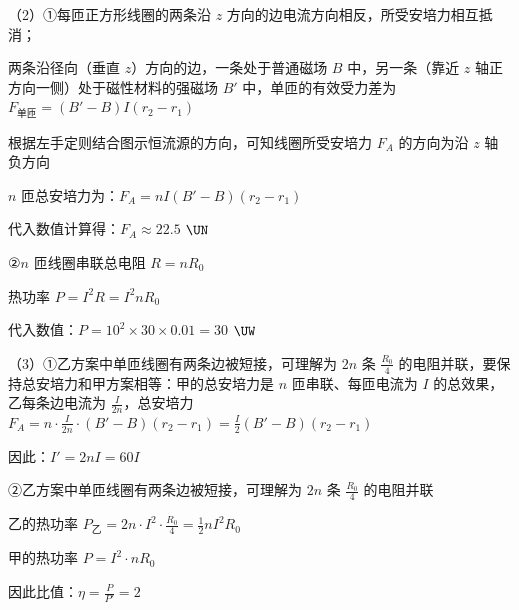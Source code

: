 \documentclass[\gkver]{gaokaozhenti}
\begin{document}
\begin{enumerate}
{（2）①每匝正方形线圈的两条沿 $z$ 方向的边电流方向相反，所受安培力相互抵消；

两条沿径向（垂直 $z$）方向的边，一条处于普通磁场 $B$ 中，另一条（靠近 $z$ 轴正方向一侧）处于磁性材料的强磁场 $B'$ 中，单匝的有效受力差为 $F_{\text{单匝}}=(B'-B)I(r_{2}-r_{1})$

根据左手定则结合图示恒流源的方向，可知线圈所受安培力 $F_{A}$ 的方向为沿 $z$ 轴负方向

$n$ 匝总安培力为：$F_{A}=nI(B'-B)(r_{2}-r_{1})$

代入数值计算得：$F_{A}\approx22.5$ $\UN$

②$n$ 匝线圈串联总电阻 $R=nR_{0}$

热功率 $P=I^{2}R=I^{2}nR_{0}$

代入数值：$P=10^{2}\times30\times0.01=30$ $\UW$

（3）①乙方案中单匝线圈有两条边被短接，可理解为 $2n$ 条 $\frac{R_{0}}{4}$ 的电阻并联，要保持总安培力和甲方案相等：甲的总安培力是 $n$ 匝串联、每匝电流为 $I$ 的总效果，乙每条边电流为 $\frac{I}{2n}$，总安培力 $F_{A}=n\cdot\frac{I}{2n}\cdot(B'-B)(r_{2}-r_{1})=\frac{I}{2}(B'-B)(r_{2}-r_{1})$

因此：$I'=2nI=60I$

②乙方案中单匝线圈有两条边被短接，可理解为 $2n$ 条 $\frac{R_{0}}{4}$ 的电阻并联

乙的热功率 $P_{\text{乙}}=2n\cdot I^{2}\cdot\frac{R_{0}}{4}=\frac{1}{2}nI^{2}R_{0}$

甲的热功率 $P=I^{2}\cdot nR_{0}$

因此比值：$\eta=\frac{P}{P'}=2$
}

\end{enumerate}
\end{document}
